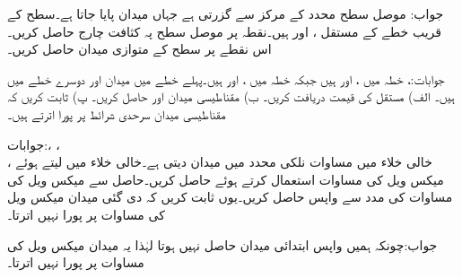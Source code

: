 جواب:
موصل سطح محدد کے مرکز سے گزرتی ہے جہاں میدان  پایا جاتا ہے۔سطح کے قریب خطے کے مستقل ،  اور  ہیں۔نقطہ  پر موصل سطح پہ کثافت چارج حاصل کریں۔اس نقطے پر سطح کے متوازی میدان حاصل کریں۔

جوابات:، 
خطہ  میں ،  اور  ہیں جبکہ خطہ  میں ،  اور  ہیں۔پہلے خطے میں میدان  اور دوسرے خطے میں  ہیں۔ الف) مستقل  کی قیمت دریافت کریں۔ ب) مقناطیسی میدان  اور  حاصل کریں۔ پ) ثابت کریں کہ مقناطیسی میدان سرحدی شرائط پر پورا اترتے ہیں۔

جوابات:، ،\\
  ،
خالی خلاء میں مساوات  نلکی محدد میں میدان دیتی ہے۔خالی خلاء میں  لیتے ہوئے میکس ویل کی مساوات  استعمال کرتے ہوئے  حاصل کریں۔حاصل  سے میکس ویل کی مساوات  کی مدد سے  واپس  حاصل کریں۔یوں ثابت کریں کہ دی گئی میدان میکس ویل کی مساوات پر پورا نہیں اترتا۔ 

جواب:چونکہ ہمیں واپس ابتدائی میدان حاصل نہیں ہوتا لہٰذا یہ میدان میکس ویل کی مساوات پر پورا نہیں اترتا۔
